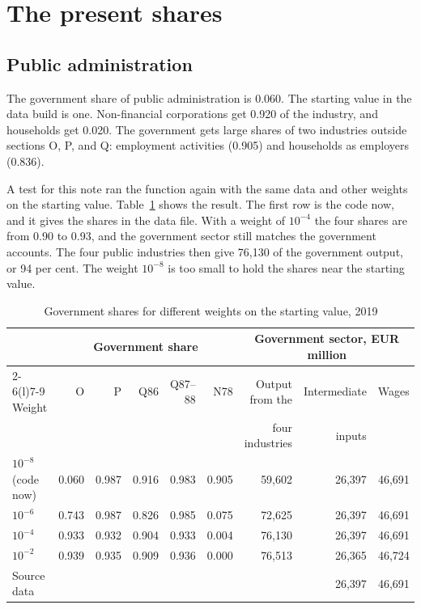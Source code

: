 \documentclass[11pt,a4paper]{article}
\newcommand{\code}[1]{\texttt{\detokenize{#1}}}
\begin{document}
\section{The present shares}
\label{sec:shares}

\subsection{Public administration}

The government share of public administration is 0.060. The starting value in the data build is one.
Non-financial corporations get 0.920 of the industry, and households get 0.020.
The government gets large shares of two industries outside sections O, P, and Q: employment activities (0.905) and households as employers (0.836).

A test for this note ran the function \code{build_industry_sector_shares} again with the same data and other weights on the starting value.
Table~\ref{tab:test} shows the result. The first row is the code now, and it gives the shares in the data file.
With a weight of $10^{-4}$ the four shares are from 0.90 to 0.93, and the government sector still matches the government accounts.
The four public industries then give 76,130 of the government output, or 94 per cent.
The weight $10^{-8}$ is too small to hold the shares near the starting value.

\begin{table}[!htbp]
\centering
\small
\caption{Government shares for different weights on the starting value, 2019}
\label{tab:test}
\begin{tabular}{@{}lrrrrrrrr@{}}
\toprule
 & \multicolumn{5}{c}{Government share} & \multicolumn{3}{c}{Government sector, EUR million} \\
\cmidrule(lr){2-6}\cmidrule(l){7-9}
Weight & O & P & Q86 & Q87--88 & N78 & Output from the & Intermediate & Wages \\
 & & & & & & four industries & inputs & \\
\midrule
$10^{-8}$ (code now) & 0.060 & 0.987 & 0.916 & 0.983 & 0.905 & 59,602 & 26,397 & 46,691 \\
$10^{-6}$ & 0.743 & 0.987 & 0.826 & 0.985 & 0.075 & 72,625 & 26,397 & 46,691 \\
$10^{-4}$ & 0.933 & 0.932 & 0.904 & 0.933 & 0.004 & 76,130 & 26,397 & 46,691 \\
$10^{-2}$ & 0.939 & 0.935 & 0.909 & 0.936 & 0.000 & 76,513 & 26,365 & 46,724 \\
\midrule
Source data & & & & & & & 26,397 & 46,691 \\
\bottomrule
\end{tabular}
\end{table}
\end{document}
